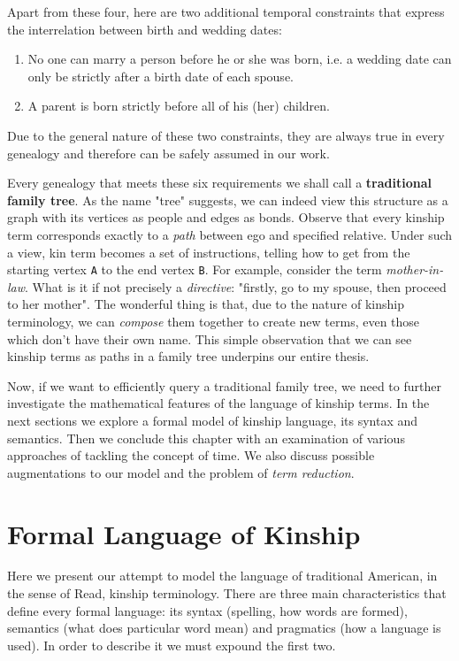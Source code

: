     Apart from these four, here are two additional temporal constraints that express the interrelation between birth and wedding
    dates:
    \begin{enumerate}
        \item{No one can marry a person before he or she was born, i.e. a wedding date can only be strictly after a
            birth date of each spouse.}
        \item{A parent is born strictly before all of his (her) children.}
    \end{enumerate}
    Due to the general nature of these two constraints, they are always true in every genealogy and therefore can be safely
    assumed in our work.

    Every genealogy that meets these six requirements we shall call a \textbf{traditional family tree}. As the name "tree" suggests,
    we can indeed view this structure as a graph with its vertices as people and edges as bonds. Observe that every kinship term
    corresponds exactly to a \textit{path} between ego and specified relative. Under such a view, kin term becomes a set of instructions,
    telling how to get from the starting vertex \texttt{A} to the end vertex \texttt{B}. For example, consider the term
    \textit{mother-in-law}. What is it if not precisely a \textit{directive}: "firstly, go to my spouse, then proceed to her mother".
    The wonderful thing is that, due to the nature of kinship terminology, we can \textit{compose} them together to create
    new terms, even those which don't have their own name. This simple observation that we can see kinship terms as paths in a family
    tree underpins our entire thesis.

    Now, if we want to efficiently query a traditional family tree, we need to further investigate the mathematical features of
    the language of kinship terms. In the next sections we explore a formal model of kinship language, its syntax and semantics.
    Then we conclude this chapter with an examination of various approaches of tackling the concept of time. We also discuss
    possible augmentations to our model and the problem of \textit{term reduction}.

\section{Formal Language of Kinship}
\label{sec:formal}
    Here we present our attempt to model the language of traditional American, in the sense of Read\cite{read}, kinship terminology.
    There are three main characteristics that define every formal language: its syntax (spelling, how words are formed), semantics
    (what does particular word mean) and pragmatics (how a language is used). In order to describe it we must expound the first two.

